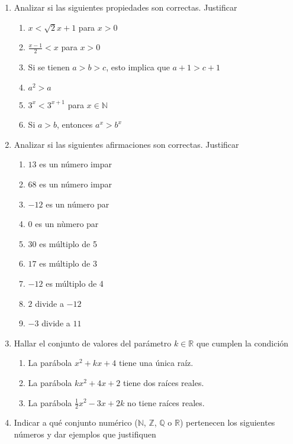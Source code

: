 \documentclass[a4paper]{article}
\newcommand{\exercise}{\item}
\begin{document}
\begin{enumerate}
	\exercise Analizar si las siguientes propiedades son correctas. Justificar
	\begin{multicols}{2}
	\begin{enumerate} [label=(\alph*)]
		\item $x < \sqrt{2} x +1$ para $x>0$
		\item $\displaystyle\frac{x-1}{2} < x$ para $x>0$
		\item Si se tienen $a>b>c$, esto implica que $a+1>c+1$
		\item $a^2 > a$
		\item $3^{x} < 3^{x+1}$ para $x \in \mathbb{N}$
		\item Si $a>b$, entonces $a^x > b^x$
	\end{enumerate}
	\end{multicols}
	\exercise Analizar si las siguientes afirmaciones son correctas. Justificar
	\begin{multicols}{2}
	\begin{enumerate} [label=(\alph*)]
		\item $13$ es un número impar
		\item $68$ es un número impar
		\item $-12$ es un número par
		\item $0$ es un nùmero par
		\item $30$ es múltiplo de 5
		\item $17$ es múltiplo de 3
		\item $-12$ es múltiplo de 4
		\item $2$ divide a $-12$
		\item $-3$ divide a $11$
	\end{enumerate}
	\end{multicols}
	\exercise Hallar el conjunto de valores del parámetro $k \in \mathbb{R}$ que cumplen la condición
	\begin{enumerate} [label=(\alph*)]
		\item La parábola $x^2+kx+4$ tiene una única raíz.
		\item La parábola $kx^2+4x+2$ tiene dos raíces reales.
		\item La parábola $\displaystyle\frac{1}{2}x^2-3x+2k$ no tiene raíces reales.
	\end{enumerate}
	\exercise Indicar a qué conjunto numérico ($\mathbb{N}$, $\mathbb{Z}$, $\mathbb{Q}$ o $\mathbb{R}$) pertenecen los siguientes números y dar ejemplos que justifiquen

\end{enumerate}
\end{document}
